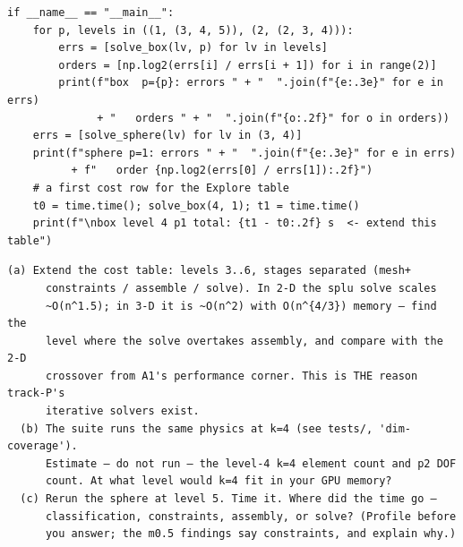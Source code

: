 \begin{lstlisting}
if __name__ == "__main__":
    for p, levels in ((1, (3, 4, 5)), (2, (2, 3, 4))):
        errs = [solve_box(lv, p) for lv in levels]
        orders = [np.log2(errs[i] / errs[i + 1]) for i in range(2)]
        print(f"box  p={p}: errors " + "  ".join(f"{e:.3e}" for e in errs)
              + "   orders " + "  ".join(f"{o:.2f}" for o in orders))
    errs = [solve_sphere(lv) for lv in (3, 4)]
    print(f"sphere p=1: errors " + "  ".join(f"{e:.3e}" for e in errs)
          + f"   order {np.log2(errs[0] / errs[1]):.2f}")
    # a first cost row for the Explore table
    t0 = time.time(); solve_box(4, 1); t1 = time.time()
    print(f"\nbox level 4 p1 total: {t1 - t0:.2f} s  <- extend this table")
\end{lstlisting}

\begin{explore}
\begin{verbatim}
(a) Extend the cost table: levels 3..6, stages separated (mesh+
      constraints / assemble / solve). In 2-D the splu solve scales
      ~O(n^1.5); in 3-D it is ~O(n^2) with O(n^{4/3}) memory — find the
      level where the solve overtakes assembly, and compare with the 2-D
      crossover from A1's performance corner. This is THE reason track-P's
      iterative solvers exist.
  (b) The suite runs the same physics at k=4 (see tests/, 'dim-coverage').
      Estimate — do not run — the level-4 k=4 element count and p2 DOF
      count. At what level would k=4 fit in your GPU memory?
  (c) Rerun the sphere at level 5. Time it. Where did the time go —
      classification, constraints, assembly, or solve? (Profile before
      you answer; the m0.5 findings say constraints, and explain why.)
\end{verbatim}
\end{explore}
